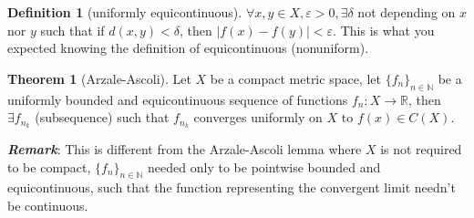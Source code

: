 \documentclass[12pt]{article}
\theoremstyle{definition}
\newtheorem{theorem}{Theorem}[section]
\newtheorem{definition}{Definition}[section]
\begin{document}
\begin{definition}[uniformly equicontinuous]
	$\forall x,y \in X, \varepsilon > 0, \exists \delta$ not depending on $x$ nor $y$ such that if $d(x,y) < \delta$, then $|f(x) - f(y)| < \varepsilon$. This is what you expected knowing the definition of equicontinuous (nonuniform).
\end{definition}

\begin{theorem}[Arzale-Ascoli]
	Let $X$ be a compact metric space, let $\{f_n\}_{n \in \mathbb{N}}$ be a uniformly bounded and equicontinuous sequence of functions $f_n \colon X \to \mathbb{R}$, then $\exists f_{n_k}$ (subsequence) such that $f_{n_k}$ converges uniformly on $X$ to $f(x) \in C(X)$. 

\end{theorem}

\textit{\textbf{Remark}}:
This is different from the Arzale-Ascoli lemma where $X$ is not required to be compact, $\{f_n\}_{n \in \mathbb{N}}$ needed only to be pointwise bounded and equicontinuous, such that the function representing the convergent limit needn't be continuous. 
\end{document}
